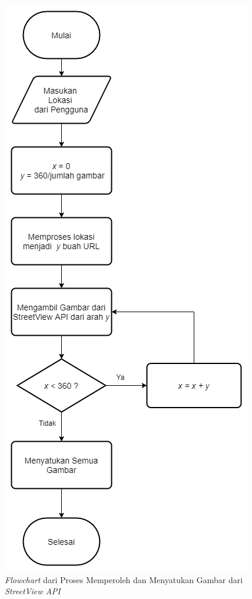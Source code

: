 \begin{figure}[h]
	\centering
		\includegraphics[scale=0.6]{Gambar/streetview-flowchart.png}
	\caption{\textit{Flowchart} dari Proses Memperoleh dan Menyatukan Gambar dari \textit{StreetView API}}
	\label{fig:streetview-flowchart}
\end{figure}

